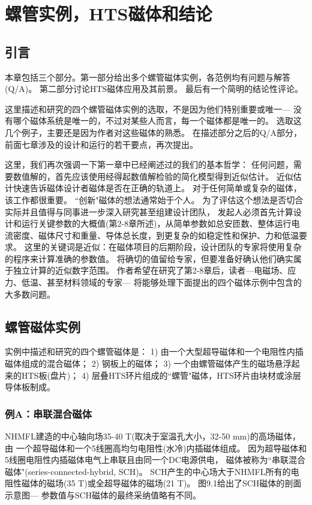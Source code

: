 \chapter{螺管实例，HTS磁体和结论}
\section{引言}
本章包括三个部分。第一部分给出多个螺管磁体实例，各范例均有问题与解答(Q/A)。
第二部分讨论HTS磁体应用及其前景。
最后有一个简明的结论性评论。

这里描述和研究的四个螺管磁体实例的选取，不是因为他们特别重要或唯一---
没有哪个磁体系统是唯一的，不过对某些人而言，每一个磁体都是唯一的。
选取这几个例子，主要还是因为作者对这些磁体的熟悉。
在描述部分之后的Q/A部分，前面七章涉及的设计和运行的若干要点，再次提出。

这里，我们再次强调一下第一章中已经阐述过的我们的基本哲学：
任何问题，需要数值解的，首先应该使用经得起数值解检验的简化模型得到近似估计。
近似估计快速告诉磁体设计者磁体是否在正确的轨道上。
对于任何简单或复杂的磁体，该工作都很重要。
``创新"磁体的想法通常始于个人。
 为了评估这个想法是否切合实际并且值得与同事进一步深入研究甚至组建设计团队，
 发起人必须首先计算设计和运行关键参数的大概值(第2-8章所述)，从简单参数如总安匝数、整体运行电流密度、磁体尺寸和重量、导体总长度，到更复杂的如稳定性和保护、力和低温要求。
 这里的关键词是近似：在磁体项目的后期阶段，设计团队的专家将使用复杂的程序来计算准确的参数值。
 将确切的值留给专家，但要准备好确认他们确实属于独立计算的近似数字范围。
 作者希望在研究了第2-8章后，读者---电磁场、应力、低温、甚至材料领域的专家---
 将能够处理下面提出的四个磁体示例中包含的大多数问题。


\section{螺管磁体实例}
实例中描述和研究的四个螺管磁体是：
1)  由一个大型超导磁体和一个电阻性内插磁体组成的混合磁体；
2) 钢板上的磁体；
3) 一个由螺管磁体产生的磁场悬浮起来的HTS板(盘片)；
4) 层叠HTS环片组成的``螺管"磁体，HTS环片由块材或涂层导体板制成。 


\subsection{例A：串联混合磁体}
NHMFL建造的中心轴向场35-40 T(取决于室温孔大小，32-50 mm)的高场磁体，由
一个超导磁体和一个5线圈高均匀电阻性(水冷)内插磁体组成。
因为超导磁体和5线圈电阻性内插磁体电气上串联且由同一个DC电源供电，
磁体被称为``串联混合磁体"(series-connected-hybrid, SCH)。
SCH产生的中心场大于NHMFL所有的电阻性磁体的磁场(35 T)或全超导磁体的磁场(21 T)。
图9.1给出了SCH磁体的剖面示意图---
参数值与SCH磁体的最终采纳值略有不同。

